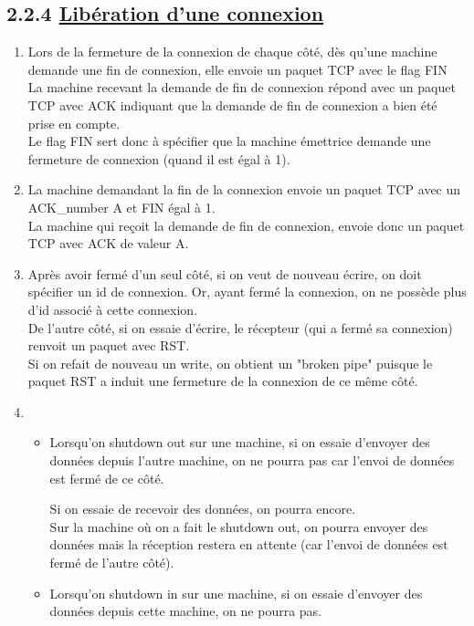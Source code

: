 \documentclass{article}
\begin{document}
\subsection*{2.2.4 \underline{Libération d'une connexion}}

\begin{enumerate}[resume]
	\item Lors de la fermeture de la connexion de chaque côté, dès qu'une machine demande une fin de connexion, elle envoie un paquet TCP avec le flag FIN\\
	
La machine recevant la demande de fin de connexion répond avec un paquet TCP avec ACK indiquant que la demande de fin de connexion a bien été prise en compte.\\

Le flag FIN sert donc à spécifier que la machine émettrice demande une fermeture de connexion (quand il est égal à 1).
	
	\item La machine demandant la fin de la connexion envoie un paquet TCP avec un ACK_number A et FIN égal à 1.\\
	
La machine qui reçoit la demande de fin de connexion, envoie donc un paquet TCP avec ACK de valeur A.

	\item Après avoir fermé d'un seul côté, si on veut de nouveau écrire, on doit spécifier un id de connexion. Or, ayant fermé la connexion, on ne possède plus d'id associé à cette connexion.\\
	
De l'autre côté, si on essaie d'écrire, le récepteur (qui a fermé sa connexion) renvoit un paquet avec RST.\\

Si on refait de nouveau un write, on obtient un "broken pipe" puisque le paquet RST a induit une fermeture de la connexion de ce même côté.

	\item 
	\begin{itemize}
		\item Lorsqu'on shutdown out sur une machine, si on essaie d'envoyer des données depuis l'autre machine, on ne pourra pas car l'envoi de données est fermé de ce côté.
		
Si on essaie de recevoir des données, on pourra encore.\\

Sur la machine où on a fait le shutdown out, on pourra envoyer des données mais la réception restera en attente (car l'envoi de données est fermé de l'autre côté).
		\item Lorsqu'on shutdown in sur une machine, si on essaie d'envoyer des données depuis cette machine, on ne pourra pas.
		

\end{itemize}
\end{enumerate}
\end{document}
